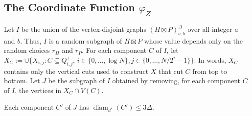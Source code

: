 \documentclass{patmorin}
\renewcommand{\le}{\leqslant}
\DeclareMathOperator{\diam}{diam}
\begin{document}
%
%

\subsection{\boldmath The Coordinate Function $\varphi_Z$}

Let $I$ be the union of the vertex-disjoint graphs $(H\boxtimes P)^\Delta_{a,b}$ over all integer $a$ and $b$.  Thus, $I$ is a random subgraph of $H\boxtimes P$ whose value depends only on the random choices $r_H$ and $r_P$.  For each component $C$ of $I$, let $X_C:=\cup\{X_{i,j}:C\subseteq Q^+_{i,j},\, i\in\{0,\ldots,\log N\}, j\in\{0,\ldots,N/2^i-1\}\}$.  In words, $X_C$ contains only the vertical cuts used to construct $X$ that cut $C$ from top to bottom. Let $J$ be the subgraph of $I$ obtained by removing, for each component $C$ of $I$, the vertices in $X_C\cap V(C)$.

\begin{lem}\label{dstar_component_diameter}
  Each component $C'$ of $J$ has $\diam_{d^*}(C')\le 3\Delta$.
\end{lem}
\end{document}
